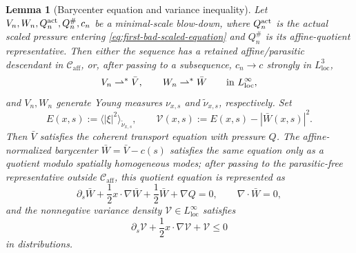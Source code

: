 \documentclass[11pt]{amsart}
\numberwithin{equation}{section}
\theoremstyle{plain}
\newtheorem{lemma}[lemma]{Lemma}
\theoremstyle{definition}
\theoremstyle{remark}
\newcommand{\loc}{\mathrm{loc}}
\newcommand{\Caff}{\mathcal C_{\mathrm{aff}}}
\begin{document}
\begin{lemma}[Barycenter equation and variance inequality]
\label{lem:first-bad-young-variance}
Let \(V_n,W_n,Q_n^{\rm act},Q_n^\#,c_n\) be a minimal-scale blow-down, where
\(Q_n^{\rm act}\) is the actual scaled pressure entering
\eqref{eq:first-bad-scaled-equation} and \(Q_n^\#\) is its affine-quotient
representative.  Then either the sequence has
a retained affine/parasitic descendant in \(\Caff\), or, after passing to a
subsequence, \(c_n\to c\) strongly in \(L^3_{\loc}\),
\[
   V_n\rightharpoonup^\ast \bar V,\qquad
   W_n\rightharpoonup^\ast \bar W
   \qquad\hbox{in }L^\infty_{\loc},
\]
and \(V_n,W_n\) generate Young measures \(\nu_{x,s}\) and
\(\widetilde\nu_{x,s}\), respectively.  Set
\[
   E(x,s):=\langle |\xi|^2\rangle_{\widetilde\nu_{x,s}},
   \qquad
   \mathcal V(x,s):=E(x,s)-|\bar W(x,s)|^2 .
\]
Then \(\bar V\) satisfies the coherent transport equation with pressure \(Q\).
The affine-normalized barycenter \(\bar W=\bar V-c(s)\) satisfies the same
equation only as a quotient modulo spatially homogeneous modes; after passing
to the parasitic-free representative outside \(\Caff\), this quotient equation
is represented as
\begin{equation}\label{eq:first-bad-barycenter-equation}
   \partial_s\bar W+\frac12x\cdot\nabla\bar W+\frac12\bar W+\nabla Q=0,
   \qquad \nabla\cdot\bar W=0,
\end{equation}
and the nonnegative variance density \(\mathcal V\in L^\infty_{\loc}\)
satisfies
\begin{equation}\label{eq:first-bad-variance-ineq}
   \partial_s\mathcal V+\frac12x\cdot\nabla\mathcal V+\mathcal V\le0
\end{equation}
in distributions.
\end{lemma}
\end{document}
